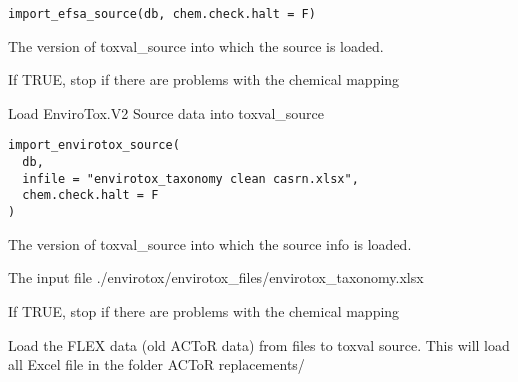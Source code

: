 \documentclass[letterpaper]{book}
\begin{document}
%
\begin{Usage}
\begin{verbatim}
import_efsa_source(db, chem.check.halt = F)
\end{verbatim}
\end{Usage}
%
\begin{Arguments}
\begin{ldescription}
\item[\code{db}] The version of toxval\_source into which the source is loaded.

\item[\code{chem.check.halt}] If TRUE, stop if there are problems with the chemical mapping
\end{ldescription}
\end{Arguments}
%
\begin{Description}\relax
Load EnviroTox.V2 Source data into toxval\_source
\end{Description}
%
\begin{Usage}
\begin{verbatim}
import_envirotox_source(
  db,
  infile = "envirotox_taxonomy clean casrn.xlsx",
  chem.check.halt = F
)
\end{verbatim}
\end{Usage}
%
\begin{Arguments}
\begin{ldescription}
\item[\code{db}] The version of toxval\_source into which the source info is loaded.

\item[\code{infile}] The input file ./envirotox/envirotox\_files/envirotox\_taxonomy.xlsx

\item[\code{chem.check.halt}] If TRUE, stop if there are problems with the chemical mapping
\end{ldescription}
\end{Arguments}
%
\begin{Description}\relax
Load the FLEX data (old ACToR data) from files to toxval source. This will load all
Excel file in the folder ACToR replacements/
\end{Description}
\end{document}
